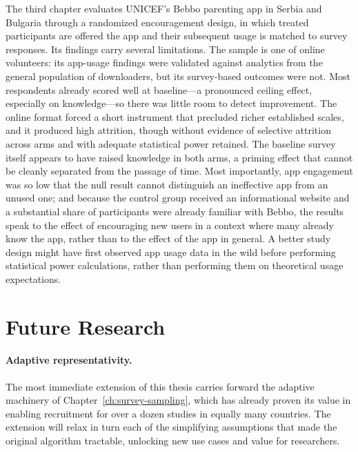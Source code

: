 The third chapter evaluates UNICEF's Bebbo parenting app in Serbia and Bulgaria through a randomized encouragement design, in which treated participants are offered the app and their subsequent usage is matched to survey responses. Its findings carry several limitations. The sample is one of online volunteers: its app-usage findings were validated against analytics from the general population of downloaders, but its survey-based outcomes were not. Most respondents already scored well at baseline---a pronounced ceiling effect, especially on knowledge---so there was little room to detect improvement. The online format forced a short instrument that precluded richer established scales, and it produced high attrition, though without evidence of selective attrition across arms and with adequate statistical power retained. The baseline survey itself appears to have raised knowledge in both arms, a priming effect that cannot be cleanly separated from the passage of time. Most importantly, app engagement was so low that the null result cannot distinguish an ineffective app from an unused one; and because the control group received an informational website and a substantial share of participants were already familiar with Bebbo, the results speak to the effect of encouraging new users in a context where many already know the app, rather than to the effect of the app in general. A better study design might have first observed app usage data in the wild before performing statistical power calculations, rather than performing them on theoretical usage expectations. 


\section{Future Research}

\paragraph{Adaptive representativity.} The most immediate extension of this thesis carries forward the adaptive machinery of Chapter~\ref{ch:survey-sampling}, which has already proven its value in enabling recruitment for over a dozen studies in equally many countries.  The extension will relax in turn each of the simplifying assumptions that made the original algorithm tractable, unlocking new use cases and value for researchers. 

